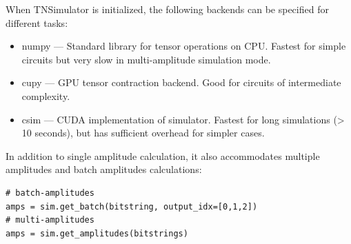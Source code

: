 When TNSimulator is initialized, the following backends can be specified for different tasks:
\begin{itemize}
    \item numpy --- Standard library for tensor operations on CPU. Fastest for simple circuits but very slow in multi-amplitude simulation mode.
    \item cupy --- GPU tensor contraction backend. Good for circuits of intermediate complexity.
    \item csim --- CUDA implementation of simulator. Fastest for long simulations (> 10 seconds), but has sufficient overhead for simpler cases.
\end{itemize}

In addition to single amplitude calculation, it also accommodates multiple amplitudes and batch amplitudes calculations:
\begin{lstlisting}
# batch-amplitudes
amps = sim.get_batch(bitstring, output_idx=[0,1,2])
# multi-amplitudes
amps = sim.get_amplitudes(bitstrings)
\end{lstlisting}

